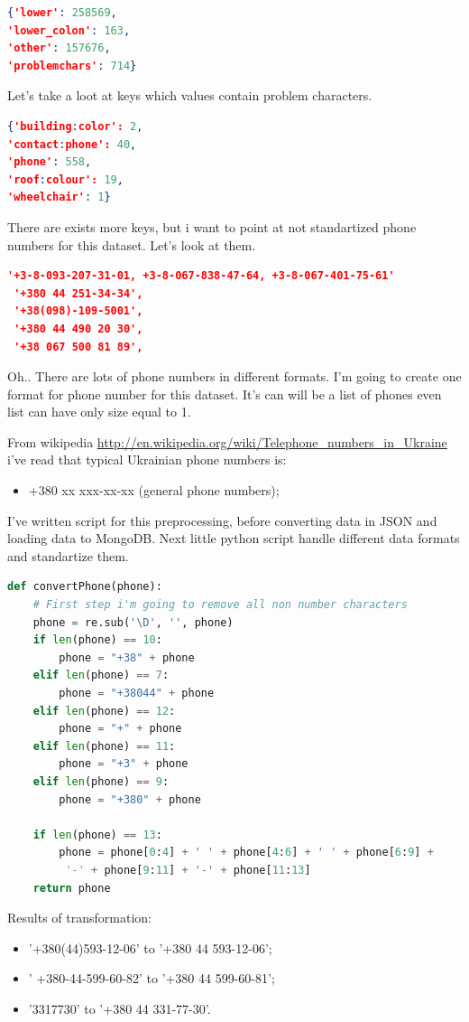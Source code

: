 \documentclass[a4paper,12pt]{article}
\begin{document}
\begin{lstlisting}[language=json,firstnumber=1]
{'lower': 258569,
'lower_colon': 163,
'other': 157676,
'problemchars': 714}
\end{lstlisting}
Let's take a loot at keys which values contain problem characters.
\begin{lstlisting}[language=json,firstnumber=1]
{'building:color': 2,
'contact:phone': 40,
'phone': 558,
'roof:colour': 19,
'wheelchair': 1}
\end{lstlisting}
There are exists more keys, but i want to point at not standartized phone numbers for this dataset. Let's look at them.
\begin{lstlisting}[language=json, firstnumber=1]
'+3-8-093-207-31-01, +3-8-067-838-47-64, +3-8-067-401-75-61'
 '+380 44 251-34-34',
 '+38(098)-109-5001',
 '+380 44 490 20 30',
 '+38 067 500 81 89',
\end{lstlisting}
Oh.. There are lots of phone numbers in different formats. I'm going to create one format for phone number for this dataset. It's can will be a list of phones even list can have only size equal to 1.\par
From wikipedia \url{http://en.wikipedia.org/wiki/Telephone_numbers_in_Ukraine} i've read that typical Ukrainian phone numbers is:
\begin{itemize}
\item +380 xx xxx-xx-xx (general phone numbers);
\end{itemize}
I've written script for this preprocessing, before converting data in JSON and loading data to MongoDB. Next little python script handle different data formats and standartize them.
\begin{lstlisting}[language=python, firstnumber=1, caption={Phone standartization}]
def convertPhone(phone):
    # First step i'm going to remove all non number characters
    phone = re.sub('\D', '', phone)
    if len(phone) == 10:
        phone = "+38" + phone
    elif len(phone) == 7:
        phone = "+38044" + phone
    elif len(phone) == 12:
        phone = "+" + phone
    elif len(phone) == 11:
        phone = "+3" + phone
    elif len(phone) == 9:
        phone = "+380" + phone

    if len(phone) == 13:
        phone = phone[0:4] + ' ' + phone[4:6] + ' ' + phone[6:9] +
         '-' + phone[9:11] + '-' + phone[11:13]
    return phone
\end{lstlisting} 
Results of transformation:
\begin{itemize}
\item '+380(44)593-12-06' to '+380 44 593-12-06';
\item ' +380-44-599-60-82' to '+380 44 599-60-81';
\item '3317730' to '+380 44 331-77-30'.
\end{itemize}
\end{document}
